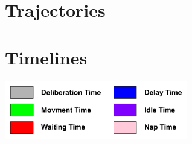 \documentclass[11pt,a4paper]{article}
\begin{document}
\newpage

\section*{Trajectories}



\newpage

\section*{Timelines}

\begin{center}
\includegraphics[width=0.6\textwidth]{timeline_legend}
\end{center}

\end{document}

